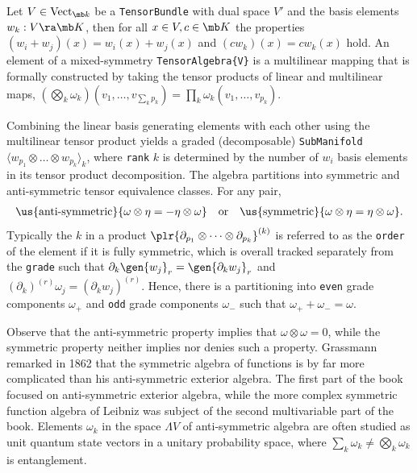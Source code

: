 \documentclass{juliacon}
\begin{document}
\begin{definition}
	Let $V\in\text{Vect}_{\mb k}$ be a \verb`TensorBundle` with dual space $V'$ and the basis elements $w_k:V\ra\mb K$, then for all $x\in V,c\in\mb K$ the properties $(w_i+w_j)(x) = w_i(x)+w_j(x)$ and $(cw_k)(x) = cw_k(x)$ hold.
	An element of a mixed-symmetry \verb`TensorAlgebra{V}` is a multilinear mapping that is formally constructed by taking the tensor products of linear and multilinear maps,
	$(\bigotimes_k \omega_k)(v_1,\dots,v_{\sum_k p_k}) = \prod_k \omega_k(v_1,\dots,v_{p_k})$.
\end{definition}
\begin{definition}
	Combining the linear basis generating elements with each other using the multilinear tensor product yields a graded (decomposable) \verb`SubManifold` $\langle w_{p_1}\otimes\dots\otimes w_{p_k}\rangle_k$, where \verb`rank` $k$ is determined by the number of $w_i$ basis elements in its tensor product decomposition.
	The algebra partitions into symmetric and anti-symmetric tensor equivalence classes.
	For any pair, %
	\begin{align*}
		&\us{\text{anti-symmetric}}{\omega\otimes\eta = -\eta\otimes\omega} & \text{or} &  &\us{\text{symmetric}}{\omega\otimes\eta = \eta\otimes\omega}.
	\end{align*}
	Typically the $k$ in a product $\plr{\partial_{p_1}\otimes\cdots\otimes\partial_{p_k}}^{(k)}$ is referred to as the \verb`order` of the element if it is fully symmetric, which is overall tracked separately from the \verb`grade` such that $\partial_k\gen{w_j}_r = \gen{\partial_kw_j}_r$ and $(\partial_k)^{(r)}\omega_j = (\partial_kw_j)^{(r)}$.
	Hence, there is a partitioning into \verb`even` grade components $\omega_+$ and \verb`odd` grade components $\omega_-$ such that $\omega_++\omega_-=\omega$.
\end{definition}
\begin{remark}
	Observe that the anti-symmetric property implies that $\omega\otimes\omega=0$, while the symmetric property neither implies nor denies such a property.
	Grassmann remarked \cite{grassmann-2} in 1862 that the symmetric algebra of functions is by far more complicated than his anti-symmetric exterior algebra.
	The first part of the book focused on anti-symmetric exterior algebra, while the more complex symmetric function algebra of Leibniz was subject of the second multivariable part of the book.
	Elements $\omega_k$ in the space $\Lambda V$ of anti-symmetric algebra are often studied as unit quantum state vectors in a unitary probability space, where $\sum_k\omega_k\neq\bigotimes_k\omega_k$ is entanglement.
\end{remark}
\end{document}
